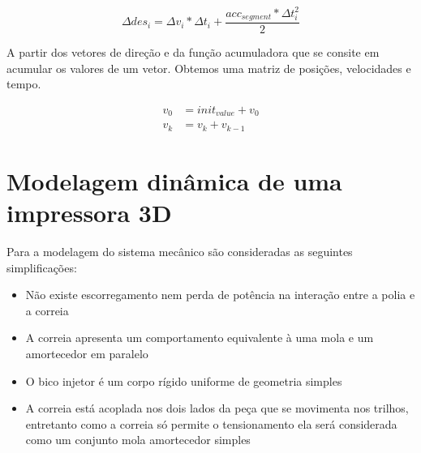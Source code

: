 \begin{equation}
    \label{eq:delta_des_interpol}
    \Delta des_i = \Delta v_i*\Delta t_i+ \frac{acc_{segment}*\Delta t_i^2}{2} 
\end{equation}

A partir dos vetores de direção e da função acumuladora que se consite em acumular os valores de um vetor.
Obtemos uma matriz de posições, velocidades e tempo.

\begin{equation}
    \label{eq:acumulator_function}
    \begin{split}
        v_{0} &= init_{value} + v_{0} \\
        v_k &= v_k+v_{k-1}
    \end{split}
\end{equation}




    







\section{Modelagem dinâmica de uma impressora 3D}
Para a modelagem do sistema mecânico são consideradas as seguintes simplificações:
\begin{itemize}
    \item Não existe escorregamento nem perda de potência na interação entre a polia e a correia
    \item A correia apresenta um comportamento equivalente à uma mola e um amortecedor em paralelo
    \item O bico injetor é um corpo rígido uniforme de geometria simples
    \item A correia está acoplada nos dois lados da peça que se movimenta nos trilhos, entretanto como a correia só permite o tensionamento ela será considerada como um conjunto mola amortecedor simples
\end{itemize}

